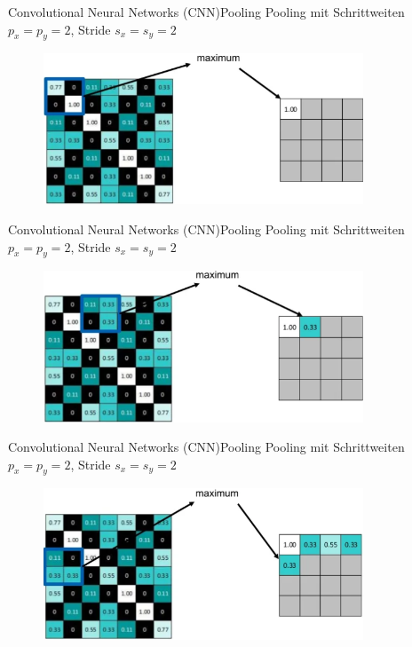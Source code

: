 \documentclass[10pt]{beamer} %
\begin{document}
\begin{frame}{Convolutional Neural Networks (CNN)}{Pooling}
   Pooling mit Schrittweiten $p_x=p_y=2$, Stride $s_x=s_y=2$ 
   \begin{figure}
      \includegraphics[width=0.85\textwidth]{pics/pool1.png}
   \end{figure}
\end{frame}

\begin{frame}{Convolutional Neural Networks (CNN)}{Pooling}
   Pooling mit Schrittweiten $p_x=p_y=2$, Stride $s_x=s_y=2$ 
   \begin{figure}
      \includegraphics[width=0.85\textwidth]{pics/pool2.png}
   \end{figure}
\end{frame}

\begin{frame}{Convolutional Neural Networks (CNN)}{Pooling}
   Pooling mit Schrittweiten $p_x=p_y=2$, Stride $s_x=s_y=2$ 
   \begin{figure}
      \includegraphics[width=0.85\textwidth]{pics/pool3.png}
   \end{figure}
\end{frame}
\end{document}
